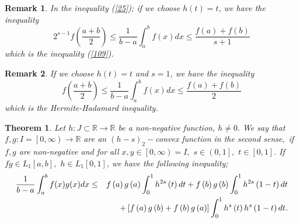 \documentclass{amsart}
\newtheorem{theorem}{Theorem}
\theoremstyle{plain}
\newtheorem{remark}{Remark}
\numberwithin{equation}{section}
\begin{document}
\begin{remark}
In the inequality (\ref{25}); \textit{if we choose }$h(t)=t$\textit{, we
have the inequality}\begin{equation*}
2^{s-1}f\left( \frac{a+b}{2}\right) \leq \frac{1}{b-a}\int_{a}^{b}f(x)dx\leq 
\frac{f(a)+f(b)}{s+1}
\end{equation*}which is the inequality (\ref{109}).
\end{remark}

\begin{remark}
\textit{If we choose }$h(t)=t$ and $s=1$\textit{, we have the inequality}\begin{equation*}
f\left( \frac{a+b}{2}\right) \leq \frac{1}{b-a}\int_{a}^{b}f(x)dx\leq \frac{f(a)+f(b)}{2}
\end{equation*}which is the Hermite-Hadamard inequality.
\end{remark}

\begin{theorem}
\label{th3} Let $h:J\subset 
\mathbb{R}
\rightarrow 
\mathbb{R}
$ be a non-negative function, $h\neq 0.$ We say that $f,g:I=\left[ 0,\infty
\right) \rightarrow 
\mathbb{R}
$ are an $(h-s)_{2}-$convex function in the second sense$,$ if $f,g$ are
non-negative and for all $x,y\in \left[ 0,\infty \right) =I,$ $s\in \left(
0,1\right] ,$ $t\in \left[ 0,1\right] .$ If $fg\in L_{1}\left[ a,b\right] ,$ 
$h\in L_{1}\left[ 0,1\right] $, we have the following inequality;\begin{eqnarray}
\frac{1}{b-a}\int_{a}^{b}f(x)g(x)dx &\leq &f\left( a\right) g\left( a\right)
\int_{0}^{1}h^{2s}\left( t\right) dt+f\left( b\right) g\left( b\right)
\int_{0}^{1}h^{2s}\left( 1-t\right) dt  \notag \\
&&+\left[ f\left( a\right) g\left( b\right) +f\left( b\right) g\left(
a\right) \right] \int_{0}^{1}h^{s}\left( t\right) h^{s}\left( 1-t\right) dt.
\label{29}
\end{eqnarray}
\end{theorem}
\end{document}
